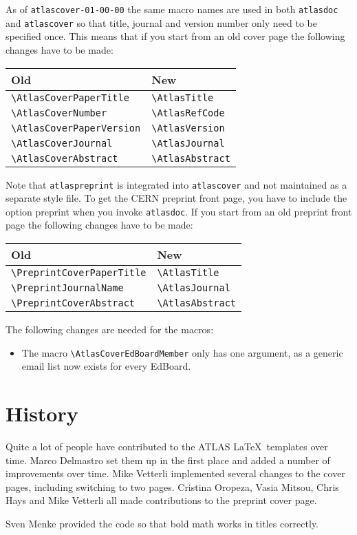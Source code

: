 \documentclass[atlasstyle,UKenglish]{latex/atlasdoc}
\newcommand{\Macro}[1]{\texttt{\textbackslash #1}\xspace}
\newcommand{\Option}[1]{\textsf{#1}\xspace}
\newcommand{\Package}[1]{\texttt{#1}\xspace}
\begin{document}
As of \Package{atlascover-01-00-00} the same macro names are used in both \Package{atlasdoc} and
\Package{atlascover} so that title, journal and version number only need to be specified once.
This means that if you start from an old cover page the following changes have to be made:
\begin{center}
  \begin{tabular}{ll}
    Old                            & New                   \\
    \midrule
    \Macro{AtlasCoverPaperTitle}   & \Macro{AtlasTitle}    \\
    \Macro{AtlasCoverNumber}       & \Macro{AtlasRefCode}  \\
    \Macro{AtlasCoverPaperVersion} & \Macro{AtlasVersion}  \\
    \Macro{AtlasCoverJournal}      & \Macro{AtlasJournal}  \\
    \Macro{AtlasCoverAbstract}     & \Macro{AtlasAbstract}
  \end{tabular}
\end{center}

Note that \Package{atlaspreprint} is integrated into \Package{atlascover} and not maintained as a separate style file.
To get the CERN preprint front page, you have to include the option \Option{preprint} when you invoke \Package{atlasdoc}.
If you start from an old preprint front page the following changes have to be made:
\begin{center}
  \begin{tabular}{ll}
    Old                              & New                   \\
    \midrule
    \Macro{PreprintCoverPaperTitle} & \Macro{AtlasTitle}    \\
    \Macro{PreprintJournalName}     & \Macro{AtlasJournal}  \\
    \Macro{PreprintCoverAbstract}   & \Macro{AtlasAbstract}
  \end{tabular}
\end{center}
The following changes are needed for the macros:
\begin{itemize}
\item The macro \Macro{AtlasCoverEdBoardMember} only has one argument, as a generic email list now exists for every EdBoard.
\end{itemize}


\section*{History}

Quite a lot of people have contributed to the ATLAS \LaTeX\ templates over time.
Marco Delmastro set them up in the first place and added a number of improvements over time.
Mike Vetterli implemented several changes to the cover pages, including switching to two pages.
Cristina Oropeza, Vasia Mitsou, Chris Hays and Mike Vetterli all made contributions to the preprint cover page.

Sven Menke provided the code so that bold math works in titles correctly.

\printbibliography
\end{document}

